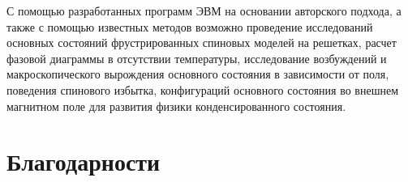 \documentclass[utf8, babel, sor, jor, amsmath, amssymb, reprint]{elsarticle} %
\begin{document}
С помощью разработанных программ ЭВМ на основании авторского подхода, а также с помощью известных методов возможно проведение исследований основных состояний фрустрированных спиновых моделей на решетках, расчет фазовой диаграммы в отсутствии температуры, исследование возбуждений и макроскопического вырождения основного состояния в зависимости от поля, поведения спинового избытка, конфигураций основного состояния во внешнем магнитном поле для развития физики конденсированного состояния.



\section{Благодарности}

 


\end{document}
